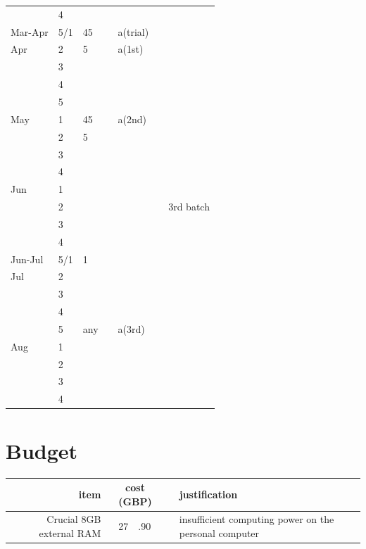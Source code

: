\documentclass[a4paper, 11pt]{article}
\begin{document}
\begin{longtable}{p{.1\linewidth}p{.1\linewidth}|p{.1\linewidth}|p{.1\linewidth}|p{.1\linewidth}|p{.1\linewidth}|p{.1\linewidth}|}
	& 4 & \cellcolor{lorange} & \cellcolor{lorange} & \cellcolor{grey90} & \cellcolor{lorange} & \cellcolor{grey90} \\
	Mar-Apr & 5/1 & \cellcolor{grey90}45 && \cellcolor{grey90}a(trial) && \cellcolor{grey90} \\
	Apr & 2 & \cellcolor{grey90}5 && \cellcolor{grey90}a(1st) && \cellcolor{grey90} \\
	& 3 & \cellcolor{grey90} && \cellcolor{grey90} && \cellcolor{grey90} \\
	& 4 & \cellcolor{grey90} && \cellcolor{grey90} && \cellcolor{grey90} \\
	& 5 & \cellcolor{grey90} && \cellcolor{grey90} && \cellcolor{grey90} \\
	May & 1 & \cellcolor{grey90}45 && \cellcolor{grey90}a(2nd) && \cellcolor{grey90} \\
	& 2 & \cellcolor{grey90}5 && \cellcolor{grey90} && \cellcolor{lorange} \\
	& 3 & \cellcolor{grey90} && \cellcolor{grey90} && \cellcolor{lorange} \\
	& 4 & \cellcolor{grey90} && \cellcolor{grey90} && \cellcolor{lorange} \\
	Jun & 1 & \cellcolor{grey90} && \cellcolor{lorange} && \cellcolor{lorange} \\
	& 2 & \cellcolor{lorange} && \cellcolor{lorange} && \cellcolor{lorange}3rd batch \\
	& 3 & \cellcolor{lorange} &&&& \cellcolor{lorange} \\
	& 4 & \cellcolor{lorange} &&&& \cellcolor{lorange} \\
	Jun-Jul & 5/1 & \cellcolor{grey90}1 &&&& \cellcolor{lorange} \\
	Jul & 2 & \cellcolor{grey90} &&&& \cellcolor{lorange} \\
	& 3 & \cellcolor{grey90} &&&& \cellcolor{lorange} \\
	& 4 & \cellcolor{grey90} &&&& \cellcolor{lorange} \\
	& 5 & \cellcolor{lorange}any && \cellcolor{lorange}a(3rd) && \cellcolor{lorange} \\
	Aug & 1 & \cellcolor{lorange} && \cellcolor{lorange} && \cellcolor{lorange} \\
	& 2 & \cellcolor{lorange} && \cellcolor{lorange} && \cellcolor{lorange} \\
	& 3 & \cellcolor{lorange} &&&& \cellcolor{lorange} \\
	& 4 & \cellcolor{lorange} &&&&\\
\end{longtable}
\section{Budget}
\begin{tabular}{r|r@{}lc|l}
	item & \multicolumn{2}{c}{cost (GBP)} && justification\\\hline
	Crucial 8GB external RAM & 27&.90 && insufficient computing power on the personal computer\\
\end{tabular}
\clearpage
\nocite{*}\printbibliography
\end{document}
